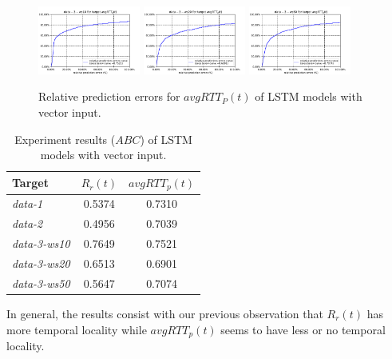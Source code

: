 \documentclass[sigconf]{acmart}
\begin{document}
	\begin{figure} 	
	\includegraphics[width=0.3\textwidth]{fig4/data-3-ws10-task-3-7030-lstm.pdf}
	\includegraphics[width=0.3\textwidth]{fig4/data-3-ws20-task-3-7030-lstm.pdf}
	\includegraphics[width=0.3\textwidth]{fig4/data-3-ws50-task-3-7030-lstm.pdf}
	\caption{Relative prediction errors for  $avgRTT_P(t)$ of LSTM models with vector input.}
	\label{fig:lstm-task3-vector}
	\end{figure}
	\begin{table}[t]
		\centering
		\begin{tabular}{lcc}
			\toprule
			{Target} &{$R_r(t)$}&{$avgRTT_p(t)$} \\
			\midrule
			\textit{data-1}& 0.5374 & 0.7310 \\
			\textit{data-2}& 0.4956& 0.7039     \\
			\textit{data-3-ws10}& 0.7649 & 0.7521 \\
			\textit{data-3-ws20}& 0.6513& 0.6901    \\
			\textit{data-3-ws50}& 0.5647& 0.7074  \\
			\bottomrule	
		\end{tabular}
		\caption{ Experiment results ($ABC$) of LSTM models with vector input. }
		\label{tab:lstm-vector}
	\end{table}
	
	In general, the results consist with our previous observation that $R_r(t)$ has more temporal locality while $avgRTT_p(t)$ seems to have less or no temporal locality.
	
\end{document}

